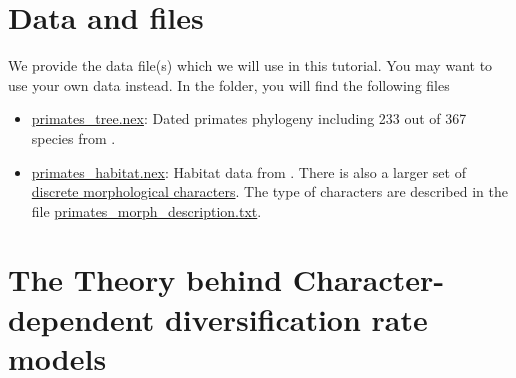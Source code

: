 \section{Data and files}

We provide the data file(s) which we will use in this tutorial.
You may want to use your own data instead.
In the  folder, you will find the following files
\begin{itemize}
\item \href{https://github.com/revbayes/revbayes_tutorial/raw/master/RB_DiversificationRate_CharacterDependent_Tutorial/data/primates\_tree.nex}{primates\_tree.nex}: Dated primates phylogeny including 233 out of 367 species from \cite{MagnusonFord2012}.
\item \href{https://github.com/revbayes/revbayes_tutorial/raw/master/RB_DiversificationRate_CharacterDependent_Tutorial/data/primates_habitat.nex}{primates\_habitat.nex}: Habitat data from \cite{MagnusonFord2012}. There is also a larger set of \href{https://github.com/revbayes/revbayes_tutorial/raw/master/RB_DiversificationRate_CharacterDependent_Tutorial/data/primates_morph.nex}{discrete morphological characters}. The type of characters are described in the file \href{https://github.com/revbayes/revbayes_tutorial/raw/master/RB_DiversificationRate_CharacterDependent_Tutorial/data/primates_morph_description.txt}{primates\_morph\_description.txt}.
\end{itemize}





\bigskip
\section{The Theory behind Character-dependent diversification rate models}\label{sec:BiSSE_Theory}

